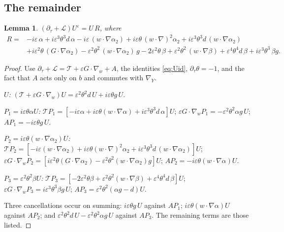 \documentclass[11pt]{article}
\newcommand{\eps}{\varepsilon}
\newcommand{\cL}{\mathcal{L}}
\newcommand{\cT}{\mathcal{T}}
\newtheorem{lemma}[theorem]{Lemma}
\theoremstyle{remark}
\begin{document}
\subsection{The remainder}

\begin{lemma}\label{lem:rem}
$(\partial_\tau + \cL)U^\eps = U\,R$, where
\begin{align*}
  R ={}& -i\eps\,\alpha + i\eps^3\theta^3 d\,\alpha
     - i\eps\,(w\cdot\nabla\alpha_2)
     + i\eps\theta\,(w\cdot\nabla)^2\alpha_2
     + i\eps^3\theta^3 d\,(w\cdot\nabla\alpha_2) \\
   & + i\eps^2\theta\,(G\cdot\nabla\alpha_2)
     - \eps^2\theta^2\,(w\cdot\nabla\alpha_2)\,g
     - 2\eps^2\theta\,\beta
     + \eps^2\theta^2\,(w\cdot\nabla\beta)
     + \eps^4\theta^4 d\,\beta
     + i\eps^3\theta^3\,\beta g .
\end{align*}
\end{lemma}

\begin{proof}
Use $\partial_\tau+\cL = \cT + \eps G\cdot\nabla_w + A$, the identities
\eqref{eq:Uid}, $\partial_\tau\theta = -1$, and the fact that $A$ acts only on
$b$ and commutes with $\nabla_Y$.

\emph{$U$:} $(\cT + \eps G\cdot\nabla_w)U = \eps^2\theta^2d\,U + i\eps\theta g\,U$.

\emph{$P_1 = i\eps\theta\alpha U$:}
$\cT P_1 = [-i\eps\alpha + i\eps\theta(w\cdot\nabla\alpha)
+ i\eps^3\theta^3d\,\alpha]U$;
$\eps G\cdot\nabla_wP_1 = -\eps^2\theta^2\alpha g\,U$;
$AP_1 = -i\eps\theta g\,U$.

\emph{$P_2 = i\eps\theta(w\cdot\nabla\alpha_2)U$:}
$\cT P_2 = [-i\eps(w\cdot\nabla\alpha_2)
+ i\eps\theta(w\cdot\nabla)^2\alpha_2
+ i\eps^3\theta^3d\,(w\cdot\nabla\alpha_2)]U$;
$\eps G\cdot\nabla_wP_2 = [i\eps^2\theta(G\cdot\nabla\alpha_2)
- \eps^2\theta^2(w\cdot\nabla\alpha_2)g]U$;
$AP_2 = -i\eps\theta(w\cdot\nabla\alpha)U$.

\emph{$P_3 = \eps^2\theta^2\beta U$:}
$\cT P_3 = [-2\eps^2\theta\beta + \eps^2\theta^2(w\cdot\nabla\beta)
+ \eps^4\theta^4d\,\beta]U$;
$\eps G\cdot\nabla_wP_3 = i\eps^3\theta^3\beta g\,U$;
$AP_3 = \eps^2\theta^2(\alpha g - d)U$.

Three cancellations occur on summing: $i\eps\theta g\,U$ against $AP_1$;
$i\eps\theta(w\cdot\nabla\alpha)U$ against $AP_2$; and
$\eps^2\theta^2d\,U - \eps^2\theta^2\alpha g\,U$ against $AP_3$. The
remaining terms are those listed.
\end{proof}
\end{document}
